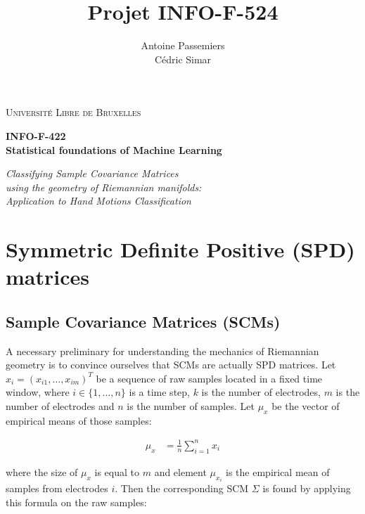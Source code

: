 \documentclass[a4paper,11pt]{report}
\title{Projet INFO-F-524}
\author{
	Antoine Passemiers \\
	Cédric Simar
}
\makeatletter
\renewcommand\bibname{Références}
\renewcommand{\refname}{Références}
\renewcommand\@biblabel[1]{#1.  }
\makeatother
\begin{document}
\renewcommand\bibname{References}
\renewcommand{\refname}{References}
\makeatletter
\renewcommand\@biblabel[1]{#1.  }
\makeatother

\begin{titlepage}
	\centering
	{\scshape\LARGE Université Libre de Bruxelles\par}
	\vfill
	{\LARGE\bfseries INFO-F-422 \\ Statistical foundations of Machine Learning \par
		\vspace{3ex}}
	{\itshape\Large Classifying Sample Covariance Matrices \\ using the geometry of Riemannian manifolds: \\ Application to Hand Motions Classification \par}
	\vfill
	\makeatletter
	{\large \@author\par}
	\vfill
	\@date\par
	\makeatother
\end{titlepage}

\tableofcontents

\setlength\parskip{0.5ex plus1ex minus.5ex}

\newpage



\chapter{Symmetric Definite Positive (SPD) matrices}

\section{Sample Covariance Matrices (SCMs)}

A necessary preliminary for understanding the mechanics of Riemannian geometry is to convince ourselves that
SCMs are actually SPD matrices. Let $x_i = (x_{i1}, \ldots, x_{im})^T$ be a sequence of raw samples
located in a fixed time window, where $i \in \{1, \ldots, n\}$ is a time step, $k$ is the number of electrodes,
$m$ is the number of electrodes and $n$ is the number of samples.
Let $\mu_x$ be the vector of empirical means of those samples:

\begin{align}
  \mu_x & = \frac{1}{n} \sum\limits_{i=1}^{n} x_i
\end{align}

\noindent where the size of $\mu_x$ is equal to $m$ and element
$\mu_{x_i}$ is the empirical mean of samples from electrodes $i$.
Then the corresponding SCM $\Sigma$ is found by applying this formula on the raw samples:
\end{document}
